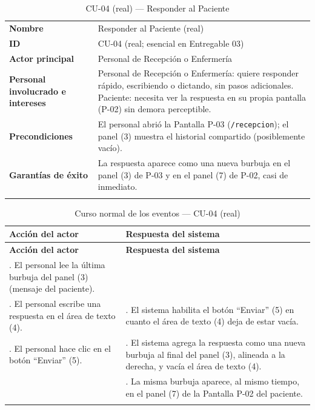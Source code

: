 
\begin{longtable}{@{}p{4.1cm} >{\raggedright\arraybackslash}p{11.2cm}@{}}
\toprule
\textbf{Nombre} & Responder al Paciente (real) \\
\textbf{ID} & CU-04 (real; esencial en Entregable 03) \\
\textbf{Actor principal} & Personal de Recepción o Enfermería \\
\textbf{Personal involucrado e intereses} &
Personal de Recepción o Enfermería: quiere responder rápido, escribiendo
o dictando, sin pasos adicionales. \newline
Paciente: necesita ver la respuesta en su propia pantalla (P-02) sin
demora perceptible. \\
\textbf{Precondiciones} &
El personal abrió la Pantalla P-03 (\texttt{/recepcion}); el panel
(3) muestra el historial compartido (posiblemente vacío). \\
\textbf{Garantías de éxito} &
La respuesta aparece como una nueva burbuja en el panel (3) de P-03 y en
el panel (7) de P-02, casi de inmediato. \\
\bottomrule
\caption{CU-04 (real) — Responder al Paciente}
\end{longtable}

\setlength{\extrarowheight}{5pt}
\begin{longtable}{@{}>{\raggedright\arraybackslash}p{} >{\raggedright\arraybackslash}p{}@{}}
\toprule
\textbf{Acción del actor} & \textbf{Respuesta del sistema} \\
\midrule
\endfirsthead
\toprule
\textbf{Acción del actor} & \textbf{Respuesta del sistema} \\
\midrule
\endhead
1. El personal lee la última burbuja del panel (3) (mensaje del
paciente). & \\
2. El personal escribe una respuesta en el área de texto (4). &
3. El sistema habilita el botón ``Enviar'' (5) en cuanto el área de
texto (4) deja de estar vacía. \\
4. El personal hace clic en el botón ``Enviar'' (5). &
5. El sistema agrega la respuesta como una nueva burbuja al final del
panel (3), alineada a la derecha, y vacía el área de texto (4). \\
&
6. La misma burbuja aparece, al mismo tiempo, en el panel (7) de la
Pantalla P-02 del paciente. \\
\bottomrule
\caption{Curso normal de los eventos --- CU-04 (real)}
\end{longtable}
\setlength{\extrarowheight}{0pt}

